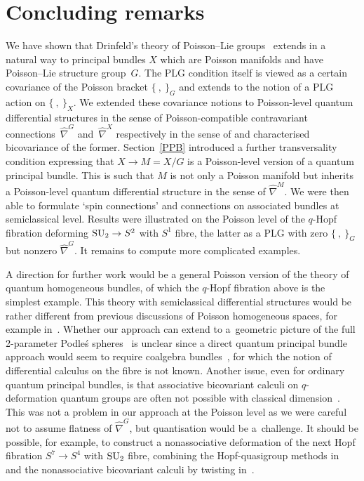 \documentclass[10pt,a4paper]{amsart}
\numberwithin{equation}{section}
\newcommand{\<}{{\langle}}
\renewcommand{\>}{{\rangle}}
\begin{document}
\section{Concluding remarks}

We have shown that Drinfeld's theory of Poisson--Lie groups~\cite{Dri:ham, Drinfeld} extends in a natural way to principal bundles $X$ which are Poisson manifolds and have Poisson--Lie structure group~$G$. The PLG condition itself is viewed as a certain covariance of the Poisson bracket $\{\ ,\ \}_G$ and extends to the notion of a PLG action on $\{\ ,\ \}_X$. We extended these covariance notions to Poisson-level quantum differential structures in the sense of Poisson-compatible contravariant connections~$\hat\nabla^G$ and~$\hat\nabla^X$ respectively in the sense of \cite{BegMa:sem,Fer,Haw, Hue,MaTao:plg} and characterised bicovariance of the former. Section~\ref{PPB} introduced a further transversality condition expressing that $X\to M=X/G$ is a Poisson-level version of a quantum principal bundle. This is such that $M$ is not only a Poisson manifold but inherits a Poisson-level quantum differential structure in the sense of $\hat\nabla^M$. We were then able to formulate `spin connections' and connections on associated bundles at semiclassical level. Results were illustrated on the Poisson level of the $q$-Hopf fibration deforming ${\rm SU}_2\to S^2$ with $S^1$ fibre, the latter as a PLG with zero $\{\ ,\ \}_G$ but nonzero $\hat\nabla^G$. It remains to compute more complicated examples.

A direction for further work would be a general Poisson version of the theory of quantum homogeneous bundles, of which the $q$-Hopf fibration above is the simplest example. This theory with semiclassical differential structures would be rather different from previous discussions of Poisson homogeneous spaces, for example in~\cite{Dri:hom}. Whether our approach can extend to a~geometric picture of the full 2-parameter Podle\'s spheres~\cite{Pod} is unclear since a direct quantum principal bundle approach would seem to require coalgebra bundles~\cite{BrzMa:coa}, for which the notion of differential calculus on the fibre is not known. Another issue, even for ordinary quantum principal bundles, is that associative bicovariant calculi on $q$-deformation quantum groups are often not possible with classical dimension~\cite{BegMa:sem}. This was not a problem in our approach at the Poisson level as we were careful not to assume flatness of $\hat\nabla^G$, but quantisation would be a~challenge. It should be possible, for example, to construct a nonassociative deformation of the next Hopf fibration $S^7 \to S^4$ with ${\rm SU}_2$ fibre, combining the Hopf-quasigroup methods in~\cite{KliMa} and the nonassociative bicovariant calculi by twisting in~\cite{BegMa:sem,BegMa:twi}.
\end{document}
